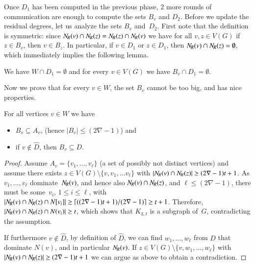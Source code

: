 Once $D_1$ has been computed in the previous phase, 2 more rounds of
communication are enough to compute the sets $B_v$ and $D_2$.
%
Before we update the residual degrees, let us analyze the sets $B_v$
and~$D_2$.  First note that the definition is symmetric: since
$N_{\hspace{-1pt}R}(v)\cap N_{\hspace{-1pt}R}(z)=N_{\hspace{-1pt}R}(z)\cap N_{\hspace{-1pt}R}(v)$ we have for all $v,z\in V(G)$ if
$z\in B_v$, then $v\in B_z$. In particular, if $v\in D_1$ or
$z\in D_1$, then $N_{\hspace{-1pt}R}(v)\cap N_{\hspace{-1pt}R}(z)=\emptyset$, which immediately
implies the following lemma.

\begin{lemma}\label{lem:WcapD1}
  We have $W\cap D_1=\emptyset$ and for every $v\in V(G)$ we have
  $B_v\cap D_1=\emptyset$.
\end{lemma}

Now we prove that for every $v\in W$, the set $B_v$ cannot be too big,
and has nice properties. 

\begin{lemma}\label{lem:dominating-dominators}
  For all vertices $v\in W$ we have

  \vspace{-5pt}
  \begin{itemize}
  \item $B_v \subseteq A_v$, (hence $|B_v|\leq (2\nabla-1)$) and \smallskip
  \item if $v\not\in \hat{D}$, then $B_v\subseteq D$.
  \end{itemize}
\end{lemma}

\begin{proof}
  Assume $A_v=\{v_1,\ldots, v_\ell\}$ (a set of possibly not distinct
  vertices) and assume there exists
  $z\in V(G)\setminus \{v,v_1,\ldots v_\ell\}$ with
  $|N_{\hspace{-1pt}R}(v) \cap N_{\hspace{-1pt}R}(z)| \geq (2\nabla-1)t+1$.  As $v_1, \ldots, v_\ell$ dominate~$N_{\hspace{-1pt}R}(v)$,
  and hence also \mbox{$N_{\hspace{-1pt}R}(v)\cap N_{\hspace{-1pt}R}(z)$}, and $\ell\leq (2\nabla-1)$, there must be some~$v_i$,
  $1\leq i\leq \ell$, with
  \mbox{$|N_{\hspace{-1pt}R}(v) \cap N_{\hspace{-1pt}R}(z) \cap N[v_i]| \geq \lceil ((2\nabla-1)t+1)/(2\nabla-1)\rceil \geq
    t+1$}.  Therefore, $|N_{\hspace{-1pt}R}(v) \cap N_{\hspace{-1pt}R}(z) \cap N(v_i)| \geq t$,
  which shows that $K_{3,t}$ is a subgraph of~$G$, contradicting the
  assumption.

  If furthermore $v\not\in \hat{D}$, by definition of $\hat{D}$, we
  can find $w_1,\ldots, w_\ell$ from $D$ that dominate $N(v)$, and in
  particular $N_{\hspace{-1pt}R}(v)$.  If $z\in V(G)\setminus \{v,w_1,\ldots, w_\ell\}$
  with $|N_{\hspace{-1pt}R}(v) \cap N_{\hspace{-1pt}R}(z)| \geq (2\nabla-1)t+1$ we can argue as above to obtain
  a contradiction.
\end{proof}

